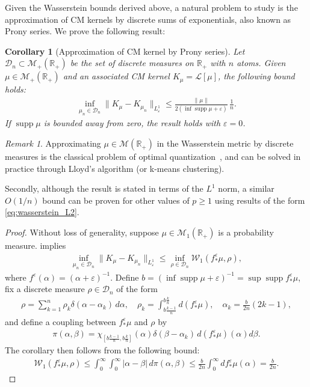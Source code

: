 \documentclass{cams-l} %
\newcommand{\dave}[1]{#1}\newcommand{\davebegin}{}\newcommand{\daveend}{}\newcommand{\george}[1]{#1}
\newcommand{\RR}{\mathbb R}
\newcommand{\cL}{\mathcal L}
\newcommand{\cM}{\mathcal M}
\newcommand{\cW}{\mathcal W}
\newcommand{\cD}{\mathcal D}
\newcommand{\eps}{\varepsilon}
\newcommand{\supp}{\operatorname{supp}}
\newtheorem{corollary}[theorem]{Corollary}
\theoremstyle{definition}
\theoremstyle{remark}
\newtheorem{remark}[theorem]{Remark}
\numberwithin{equation}{section}
\begin{document}
Given the Wasserstein bounds derived above, a natural problem to study is the approximation of CM kernels by discrete sums of exponentials, also known as Prony series. We prove the following result:
\begin{corollary}[Approximation of CM kernel by Prony series]\label{cor:quantization}
    Let $\cD_n\subset\cM_+(\RR_+)$ be the set of discrete measures on $\RR_+$ with $n$ atoms. Given $\mu\in\cM_+(\RR_+)$ and an associated CM kernel $K_\mu=\cL[\mu]$, the following bound holds:
    \begin{align*}
        \inf_{\mu_n \in \mathcal{D}_n}\|K_{\mu} - K_{\mu_n}\|_{L_\varepsilon^1} \leq \frac{\|\mu\|}{2(\inf\supp\mu + \varepsilon)}\,\frac{1}{n}.
    \end{align*}
    If $\supp\mu$ is bounded away from zero, the result holds with $\eps=0$.
\end{corollary}
\begin{remark}
    Approximating $\mu \in \cM(\RR_+)$ in the Wasserstein metric by discrete measures is the classical problem of optimal quantization~\cite{bourne2018semi}, and can be solved in practice through Lloyd's algorithm (or k-means clustering). 
    
    Secondly, although the result is stated in terms of the $L^1$ norm, a similar $O(1/n)$ bound can be proven for other values of $p\geq 1$ using results of the form \cref{eq:wasserstein_L2}. 
    
\end{remark}
\begin{proof}
    Without loss of generality, suppose $\mu\in\cM_1(\RR_+)$ is a probability measure.  implies
    \begin{align*}
        \inf_{\mu_n \in \mathcal{D}_n}\|K_{\mu} - K_{\mu_n}\|_{L_\varepsilon^1} \leq \inf_{\rho \in \mathcal{D}_n}\mathcal{W}_1(f^\varepsilon_*\mu, \rho),
    \end{align*}
    where \dave{$f^\eps(\alpha) = (\alpha+\eps)^{-1}$. Define $b=(\inf\supp\mu + \varepsilon)^{-1}=\sup\supp f_*^\eps\mu$, fix a discrete measure $\rho \in \mathcal{D}_n$ of the form
    \begin{align*}
        \rho = \sum_{k=1}^n \rho_k\delta(\alpha - \alpha_k)\,d\alpha, \quad \rho_k = \int_{b\frac{k-1}{n}}^{b\frac{k}{n}} d(f^\varepsilon_*\mu), \quad \alpha_k = \frac{b}{2n}(2k-1),
    \end{align*}
    and define} a coupling between $f_*^\eps\mu$ and $\rho$ by
    \begin{align*}
        \pi(\alpha, \beta) = \chi_{[b\frac{k-1}{n}, b\frac{k}{n}]}(\alpha)\delta(\beta - \alpha_k)\,d(f^\varepsilon_*\mu)(\alpha)d\beta.
    \end{align*}
    The corollary then follows from the following bound:
    \begin{align*}
        \cW_1(f^\varepsilon_*\mu, \rho) \leq \int_0^\infty\int_0^\infty |\alpha - \beta|\,d\pi(\alpha, \beta) \leq \frac{b}{2n} \int_0^\infty df^\varepsilon_*\mu(\alpha) = \frac{b}{2n}.
    \end{align*}
\end{proof}
\end{document}
